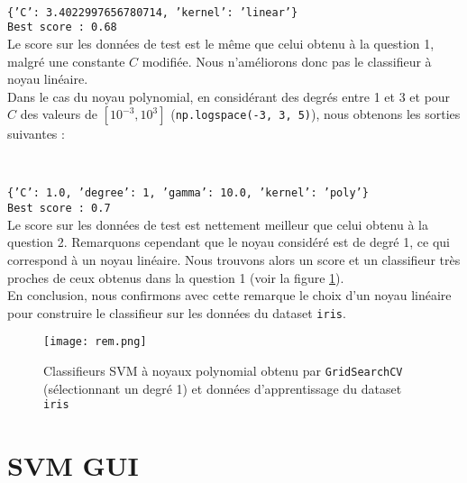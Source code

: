 \documentclass[11pt,a4paper]{article}
\theoremstyle{definition}
\begin{document}
\

\texttt{\{'C': 3.4022997656780714, 'kernel': 'linear'\}}\\
\texttt{Best score : 0.68}\\

Le score sur les données de test est le même que celui obtenu à la question 1, malgré une constante $C$ modifiée. Nous n'améliorons donc pas le classifieur à noyau linéaire.\\
Dans le cas du noyau polynomial, en considérant des degrés entre 1 et 3 et pour $C$ des valeurs de $[10^{-3},10^{3}]$ (\texttt{np.logspace(-3, 3, 5)}), nous obtenons les sorties suivantes :

\

\texttt{\{'C': 1.0, 'degree': 1, 'gamma': 10.0, 'kernel': 'poly'\}}\\
\texttt{Best score : 0.7}\\

Le score sur les données de test est nettement meilleur que celui obtenu à la question 2. Remarquons cependant que le noyau considéré est de degré 1, ce qui correspond à un noyau linéaire. Nous trouvons alors un score et un classifieur très proches de ceux obtenus dans la question 1 (voir la figure \ref{remarque}). \\
En conclusion, nous confirmons avec cette remarque le choix d'un noyau linéaire pour construire le classifieur sur les données du dataset \texttt{iris}.

 
\begin{figure}[h!]\centering
\texttt{[image: rem.png]}
\caption{Classifieurs SVM à noyaux polynomial obtenu par  \texttt{GridSearchCV} (sélectionnant un degré 1) et données d'apprentissage du dataset \texttt{iris}}
\label{remarque}
\end{figure}

\section{SVM GUI}
\end{document}
